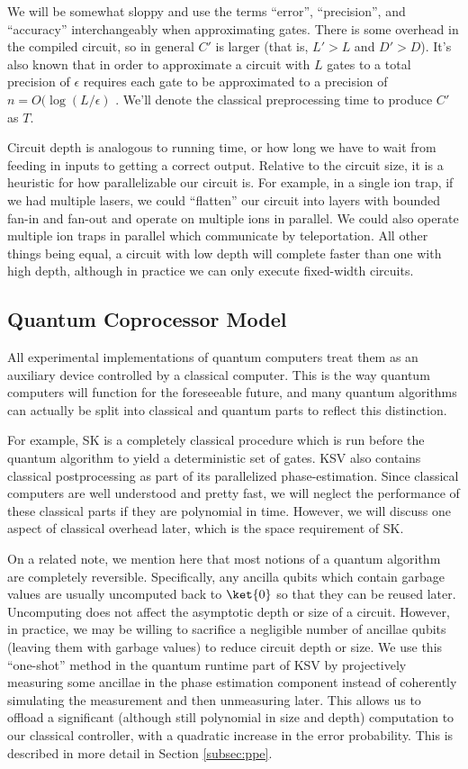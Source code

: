 We will be somewhat sloppy and use the terms ``error'', ``precision'', and
``accuracy'' interchangeably when approximating gates.
There is some overhead in the compiled circuit, so in
general $C'$ is larger (that is, $L' > L$ and $D' > D$). It's also known that
in order to approximate a circuit with $L$ gates to a total precision of
$\epsilon$
requires each gate to be approximated to a precision of
$n = O(\log(L/\epsilon)$ \cite{Lloyd1995}.
We'll denote the classical preprocessing time to
produce $C'$ as $T$.
 
Circuit depth is analogous to running time, or how long we have to wait from
feeding in inputs to getting a correct output. Relative to the circuit size,
it is a heuristic for how parallelizable our
circuit is. For example, in a single ion trap, if we had multiple lasers,
we could ``flatten'' our circuit into layers with bounded fan-in and
fan-out and operate on multiple ions in parallel.
We could also operate multiple ion traps in parallel which communicate by
teleportation.
All other things being equal, a circuit with low depth will complete
faster than one with high depth, although in practice we can only execute
fixed-width circuits.

\subsection{Quantum Coprocessor Model}

All experimental implementations of quantum computers treat them as an
auxiliary device controlled by a classical computer. This is the way
quantum computers will function for the foreseeable future, and many
quantum algorithms can actually be split into classical and quantum parts
to reflect this distinction.

For example,
SK is a completely classical procedure which is run before
the quantum algorithm to yield a deterministic set of gates. KSV
also contains classical postprocessing as part of its parallelized
phase-estimation. Since classical computers are well understood and
pretty fast, we will neglect the performance of these classical parts
if they are polynomial in time. However, we will discuss one aspect
of classical overhead later, which is the space requirement of SK.

On a related note, we mention here that most notions of a quantum algorithm
are completely reversible. Specifically, any ancilla qubits which contain
garbage values are usually uncomputed back to $\ket{0}$ so that they can be
reused later. Uncomputing does not affect the asymptotic depth or size of
a circuit. However, in practice, we may be willing to sacrifice a
negligible number of ancillae qubits (leaving them with garbage values) to reduce
circuit depth or size. We use this ``one-shot'' method in the quantum
runtime part of KSV by projectively measuring some ancillae in the phase
estimation component instead of coherently simulating
the measurement and then unmeasuring later. This allows us to offload a
significant (although still polynomial in size and depth) computation to our
classical controller, with a quadratic increase in the error probability.
This is described in more detail in Section \ref{subsec:ppe}.

